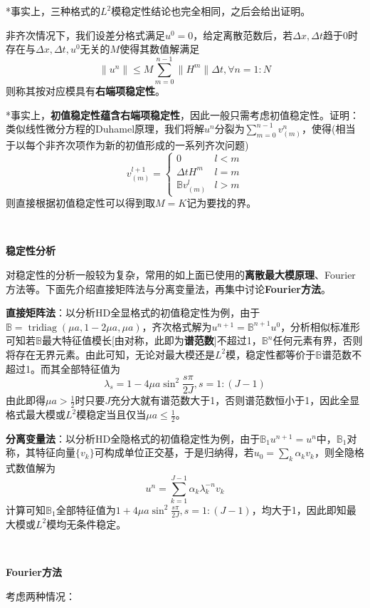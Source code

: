 \documentclass[a4paper,UTF8,fontset=windows]{ctexart}
\DeclareMathOperator{\tridiag}{tridiag}
\begin{document}
*事实上，三种格式的$L^2$模稳定性结论也完全相同，之后会给出证明。

非齐次情况下，我们设差分格式满足$u^0=0$，给定离散范数后，若$\Delta x,\Delta t$趋于0时存在与$\Delta x,\Delta t,u^0$无关的$M$使得其数值解满足
$$\|u^n\|\le M\sum_{m=0}^{n-1}\|H^m\|\Delta t,\forall n=1:N$$
则称其按对应模具有\textbf{右端项稳定性}。

*事实上，\textbf{初值稳定性蕴含右端项稳定性}，因此一般只需考虑初值稳定性。证明：类似线性微分方程的Duhamel原理，我们将解$u^n$分裂为$\sum_{m=0}^{n-1}v_{(m)}^n$，使得(相当于以每个非齐次项作为新的初值形成的一系列齐次问题)
$$v_{(m)}^{l+1}=\begin{cases}0&l<m\\\Delta tH^m&l=m\\\mathbb{B}v_{(m)}^l&l>m\end{cases}$$
则直接根据初值稳定性可以得到取$M=K$记为要找的界。

\

\textbf{稳定性分析}

对稳定性的分析一般较为复杂，常用的如上面已使用的\textbf{离散最大模原理}、Fourier方法等。下面先介绍直接矩阵法与分离变量法，再集中讨论\textbf{Fourier方法}。

\textbf{直接矩阵法}：以分析HD全显格式的初值稳定性为例，由于$\mathbb{B}=\tridiag(\mu a,1-2\mu a,\mu a)$，齐次格式解为$u^{n+1}=\mathbb{B}^{n+1}u^0$，分析相似标准形可知若$\mathbb{B}$最大特征值模长[由对称，此即为\textbf{谱范数}]不超过1，$\mathbb{B}^n$任何元素有界，否则将存在无界元素。由此可知，无论对最大模还是$L^2$模，稳定性都等价于$\mathbb{B}$谱范数不超过1。而其全部特征值为
$$\lambda_s=1-4\mu a\sin^2\frac{s\pi}{2J},s=1:(J-1)$$
由此即得$\mu a>\frac{1}{2}$时只要$J$充分大就有谱范数大于1，否则谱范数恒小于1，因此全显格式最大模或$L^2$模稳定当且仅当$\mu a\le\frac{1}{2}$。

\textbf{分离变量法}：以分析HD全隐格式的初值稳定性为例，由于$\mathbb{B}_1u^{n+1}=u^n$中，$\mathbb{B}_1$对称，其特征向量$\{v_k\}$可构成单位正交基，于是归纳得，若$u_0=\sum_k\alpha_kv_k$，则全隐格式数值解为
$$u^n=\sum_{k=1}^{J-1}\alpha_k\lambda_k^{-n}v_k$$
计算可知$\mathbb{B}_1$全部特征值为$1+4\mu a\sin^2\frac{s\pi}{2J},s=1:(J-1)$，均大于1，因此即知最大模或$L^2$模均无条件稳定。

\

\textbf{Fourier方法}

考虑两种情况：
\end{document}
